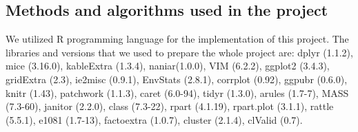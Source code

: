 \documentclass[11pt,a4paper]{article}\usepackage[]{graphicx}\usepackage[]{xcolor}
\begin{document}
	\subsection{Methods and algorithms used in the project}
	We utilized R programming language for the implementation of this project. The libraries and versions that we used to prepare the whole project are: dplyr (1.1.2), mice (3.16.0), kableExtra (1.3.4), naniar(1.0.0), VIM (6.2.2), ggplot2 (3.4.3), gridExtra (2.3), ie2misc (0.9.1), EnvStats (2.8.1), corrplot (0.92), ggpubr (0.6.0), knitr (1.43), patchwork (1.1.3), caret (6.0-94), tidyr (1.3.0), arules (1.7-7), MASS (7.3-60), janitor (2.2.0), class (7.3-22), rpart (4.1.19), rpart.plot (3.1.1), rattle (5.5.1), e1081 (1.7-13), factoextra (1.0.7), cluster (2.1.4), clValid (0.7).
\end{document}
